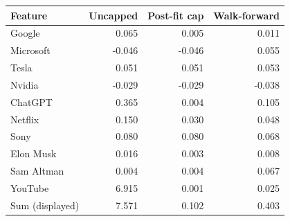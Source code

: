 \begin{tabular}{lrrr}
\toprule
Feature & Uncapped & Post-fit cap & Walk-forward \\
\midrule
Google & 0.065 & 0.005 & 0.011 \\
Microsoft & -0.046 & -0.046 & 0.055 \\
Tesla & 0.051 & 0.051 & 0.053 \\
Nvidia & -0.029 & -0.029 & -0.038 \\
ChatGPT & 0.365 & 0.004 & 0.105 \\
Netflix & 0.150 & 0.030 & 0.048 \\
Sony & 0.080 & 0.080 & 0.068 \\
Elon Musk & 0.016 & 0.003 & 0.008 \\
Sam Altman & 0.004 & 0.004 & 0.067 \\
YouTube & 6.915 & 0.001 & 0.025 \\
Sum (displayed) & 7.571 & 0.102 & 0.403 \\
\bottomrule
\end{tabular}
